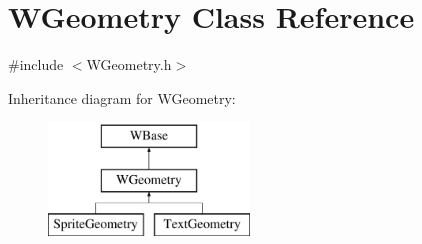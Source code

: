 \hypertarget{class_w_geometry}{}\section{W\+Geometry Class Reference}
\label{class_w_geometry}


{\ttfamily \#include $<$W\+Geometry.\+h$>$}

Inheritance diagram for W\+Geometry\+:\begin{figure}[H]
\begin{center}
\leavevmode
\includegraphics[height=3.000000cm]{class_w_geometry}
\end{center}
\end{figure}
